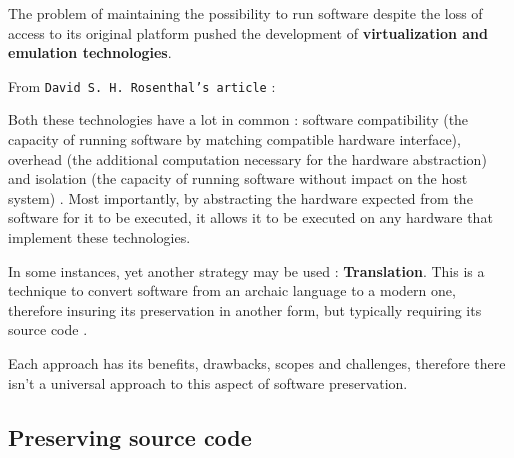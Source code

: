 \documentclass[11pt]{article}
\begin{document}
The problem of maintaining the possibility to run software despite the loss of access to its original platform pushed the development of \textbf{virtualization and emulation technologies}.

From \texttt{David S. H. Rosenthal's article} \cite{rosenthal2015emulation}:


Both these technologies have a lot in common : software compatibility (the capacity of running software by matching compatible hardware interface), overhead (the additional computation necessary for the hardware abstraction) and isolation (the capacity of running software without impact on the host system) \cite{rosenblum2004reincarnation}. Most importantly, by abstracting the hardware expected from the software for it to be executed, it allows it to be executed on any hardware that implement these technologies.

In some instances, yet another strategy may be used : \textbf{Translation}. This is a technique to convert software from an archaic language to a modern one, therefore insuring its preservation in another form, but typically requiring its source code \cite{swalwell2009towards}.

Each approach has its benefits, drawbacks, scopes and challenges, therefore there isn't a universal approach to this aspect of software preservation.


\subsection{Preserving source code}
\end{document}
